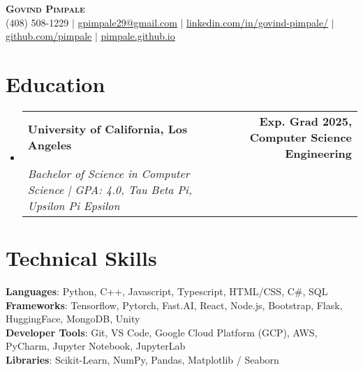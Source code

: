 \documentclass[letterpaper,11pt]{article}
\makeatletter
\newcommand{\resumeSubheading}[4]{
  \vspace{-2pt}\item
    \begin{tabular*}{0.97\textwidth}[t]{l@{\extracolsep{\fill}}r}
      \textbf{#1} & #2 \\
      \textit{\small#3} & \textit{\small #4} \\
    \end{tabular*}\vspace{-7pt}
}
\newcommand{\resumeSubHeadingListStart}{\begin{itemize}[leftmargin=0.15in, label={}]}
\newcommand{\resumeSubHeadingListEnd}{\end{itemize}}
\makeatother
\begin{document}

\begin{center}
    \textbf{\Huge \scshape Govind Pimpale} \\ \vspace{1pt}
    \small (408) 508-1229 $|$ \href{mailto:gpimpale29@gmail.com}{\underline{gpimpale29@gmail.com}} $|$ 
    \href{https://www.linkedin.com/in/govind-pimpale/}{\underline{linkedin.com/in/govind-pimpale/}} $|$
    \href{https://github.com/wz-ml}{\underline{github.com/pimpale}} $|$
    \href{https://pimpale.github.io}{\underline{pimpale.github.io}}
\end{center}


\section{Education}
  \resumeSubHeadingListStart
    \resumeSubheading
      {University of California, Los Angeles}{\hspace{-1in}\textbf{Exp. Grad 2025, Computer Science Engineering}}
      {Bachelor of Science in Computer Science | GPA: 4.0, Tau Beta Pi, Upsilon Pi Epsilon}{}
  \resumeSubHeadingListEnd

\section{Technical Skills}
 \begin{itemize}[leftmargin=0.15in, label={}]
    \small{\item{
     \textbf{Languages}{: Python, C++, Javascript, Typescript, HTML/CSS, C\#, SQL } \\
     \textbf{Frameworks}{: Tensorflow, Pytorch, Fast.AI, React, Node.js, Bootstrap, Flask, HuggingFace, MongoDB, Unity} \\
     \textbf{Developer Tools}{: Git, VS Code, Google Cloud Platform (GCP), AWS, PyCharm, Jupyter Notebook, JupyterLab} \\
     \textbf{Libraries}{: Scikit-Learn, NumPy, Pandas, Matplotlib / Seaborn}
    }}
 \end{itemize}
\end{document}
